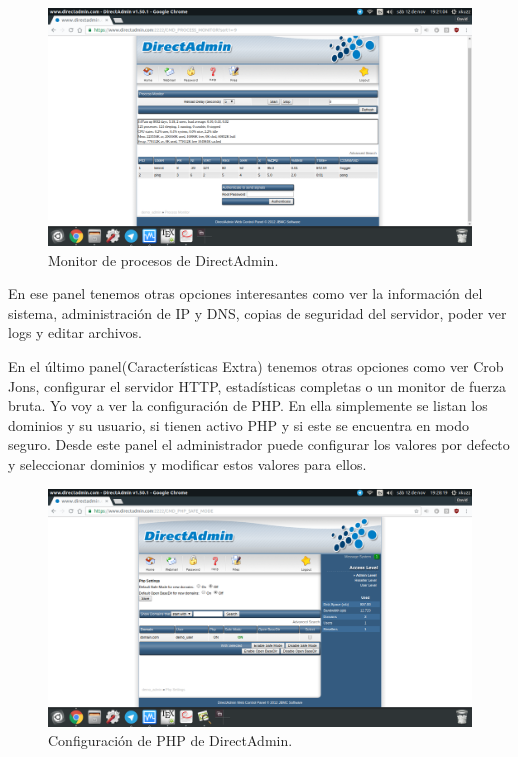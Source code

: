 \begin{flushleft}
\begin{figure}[H]
	\centering
	\includegraphics[scale=0.3]{directadmin2.png}
	\caption{Monitor de procesos de DirectAdmin.}
\end{figure}

En ese panel tenemos otras opciones interesantes como ver la información del sistema, administración de IP y DNS, copias de seguridad del servidor, poder ver logs y editar archivos.

En el último panel(Características Extra) tenemos otras opciones como ver Crob Jons, configurar el servidor HTTP, estadísticas completas o un monitor de fuerza bruta. Yo voy a ver la configuración de PHP. En ella simplemente se listan los dominios y su usuario, si tienen activo PHP y si este se encuentra en modo seguro. Desde este panel el administrador puede configurar los valores por defecto y seleccionar dominios y modificar estos valores para ellos.

\begin{figure}[H]
	\centering
	\includegraphics[scale=0.3]{directadmin3.png}
	\caption{Configuración de PHP de DirectAdmin.}
\end{figure}


\end{flushleft}
